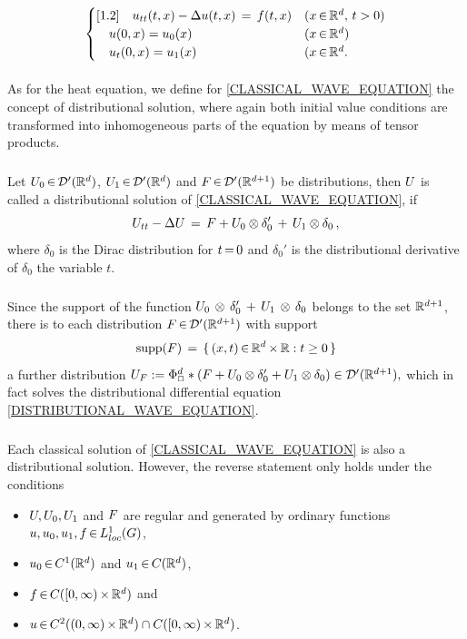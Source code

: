 \documentclass[11pt,twoside]{article}
\begin{document}
\begin{itemize}
\begin{equation}\label{CLASSICAL_WAVE_EQUATION}
\begin{cases}[1.2]
\quad u_{tt}(t,x) - \Delta u(t,x) \,=\, f(t,x) & (x {\,\in\,} {\mathbb{R}}^d, \, t > 0) \\
\quad u(0,x) = u_0(x)                       & (x {\,\in\,} {\mathbb{R}}^d) \\
\quad u_t(0,x) = u_1(x)                     & (x {\,\in\,} {\mathbb{R}}^d. \\
\end{cases}
\end{equation}

\paragraph{} %
As for the heat equation,
we define for \eqref{CLASSICAL_WAVE_EQUATION}
the concept of distributional solution,
where again both initial value conditions are transformed
into inhomogeneous parts of the equation by means of tensor products.

\subparagraph{}
Let $U_0 {\,\in\,} {\mathcal{D}}'({\mathbb{R}}^d)$, $U_1 {\,\in\,} {\mathcal{D}}'({\mathbb{R}}^d)$
and $F {\,\in\,} {\mathcal{D}}'({\mathbb{R}}^{d+1})$ be distributions,
then $U$ is called a distributional solution
of \eqref{CLASSICAL_WAVE_EQUATION},
if
\begin{equation}\label{DISTRIBUTIONAL_WAVE_EQUATION}
U_{tt} - \Delta U \,=\,
F + U_0 \otimes \delta_0' \, + \, U_1 \otimes \delta_0 \,,
\end{equation}
where $\delta_0$ is the Dirac distribution for $t {\,=\,} 0$ 
and $\delta_0'$ is the distributional derivative of $\delta_0$
{\wrt} the variable $t$.

\subparagraph{}
Since the support of the function
$U_0 \, \otimes \, \delta_0' \, + \, U_1 \, \otimes \, \delta_0$
belongs to the set ${\mathbb{R}}^{d+1}$,
there is to each distribution $F {\,\in\,} {\mathcal{D}}'({\mathbb{R}}^{d+1})$ with support
\[
\operatorname{supp}(F) \,=\, \{\, (x,t) {\,\in\,} {\mathbb{R}}^d {\,\times\,} {\mathbb{R}}: t \geq 0 \,\}
\]
a further distribution
$
U_F :=
\Phi_{\Box}^d \ast (F + U_0 \otimes \delta'_0
+ U_1 \otimes \delta_0)
\in {\mathcal{D}}'({\mathbb{R}}^{d+1}),
$
which in fact solves the distributional differential equation
\eqref{DISTRIBUTIONAL_WAVE_EQUATION}.

\subparagraph{}
Each classical solution of \eqref{CLASSICAL_WAVE_EQUATION}
is also a distributional solution.
However,
the reverse statement only holds under the conditions 

\begin{itemize}
\item[a.]
$U, U_0, U_1$ and $F$ are regular
and generated by ordinary functions $u, u_0, u_1, f {\,\in\,} L_{loc}^1(G)$,

\item[b.]
$u_0 {\,\in\,} C^1({\mathbb{R}}^d)$ and $u_1 {\,\in\,} C({\mathbb{R}}^d)$,

\item[c.]
$f {\,\in\,} C([0,\infty) {\,\times\,} {\mathbb{R}}^d)$ and

\item[d.]
$u {\,\in\,} C^2((0,\infty) {\,\times\,} {\mathbb{R}}^d) \cap C([0,\infty) {\,\times\,} {\mathbb{R}}^d)$.
\end{itemize}
\end{itemize}
\end{document}
